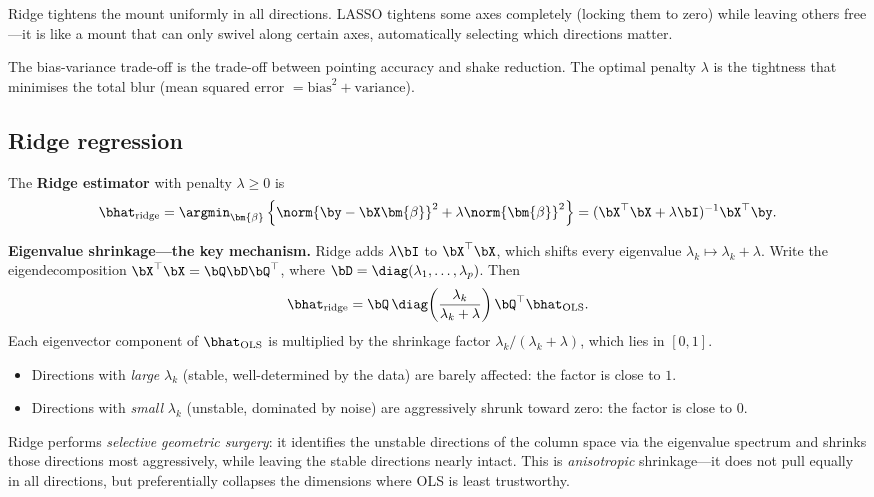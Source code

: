 Ridge tightens the mount uniformly in all directions.
LASSO tightens some axes completely (locking them to zero) while
leaving others free---it is like a mount that can only swivel along
certain axes, automatically selecting which directions matter.

The bias-variance trade-off is the trade-off between pointing accuracy
and shake reduction.
The optimal penalty $\lambda$ is the tightness that minimises the
total blur (mean squared error $= \text{bias}^2 + \text{variance}$).


\subsection{Ridge regression}

\begin{definition}
The \textbf{Ridge estimator} with penalty $\lambda\ge 0$ is
\[
  \bhat_{\text{ridge}}
  = \argmin_{\bm{\beta}}\left\{
      \norm{\by-\bX\bm{\beta}}^2 + \lambda\norm{\bm{\beta}}^2
    \right\}
  = (\bX^\top\bX + \lambda\bI)^{-1}\bX^\top\by.
\]
\end{definition}

\noindent\textbf{Eigenvalue shrinkage---the key mechanism.}
Ridge adds $\lambda\bI$ to $\bX^\top\bX$, which shifts every eigenvalue
$\lambda_k\mapsto\lambda_k+\lambda$.
Write the eigendecomposition $\bX^\top\bX = \bQ\bD\bQ^\top$, where
$\bD = \diag(\lambda_1,\dots,\lambda_p)$.
Then
\begin{equation}\label{eq:ridge-eigen}
  \bhat_{\text{ridge}}
  = \bQ\,\diag\!\left(\frac{\lambda_k}{\lambda_k+\lambda}\right)\bQ^\top
    \bhat_{\text{OLS}}.
\end{equation}
Each eigenvector component of $\bhat_{\text{OLS}}$ is multiplied by the
shrinkage factor $\lambda_k/(\lambda_k+\lambda)$, which lies in $[0,1]$.
\begin{itemize}[nosep]
  \item Directions with \emph{large} $\lambda_k$ (stable, well-determined
        by the data) are barely affected: the factor is close to $1$.
  \item Directions with \emph{small} $\lambda_k$ (unstable, dominated by
        noise) are aggressively shrunk toward zero: the factor is close
        to $0$.
\end{itemize}

\begin{keyinsight}
Ridge performs \emph{selective geometric surgery}: it identifies the
unstable directions of the column space via the eigenvalue spectrum
and shrinks those directions most aggressively, while leaving the
stable directions nearly intact.
This is \emph{anisotropic} shrinkage---it does not pull equally in
all directions, but preferentially collapses the dimensions where OLS
is least trustworthy.
\end{keyinsight}


